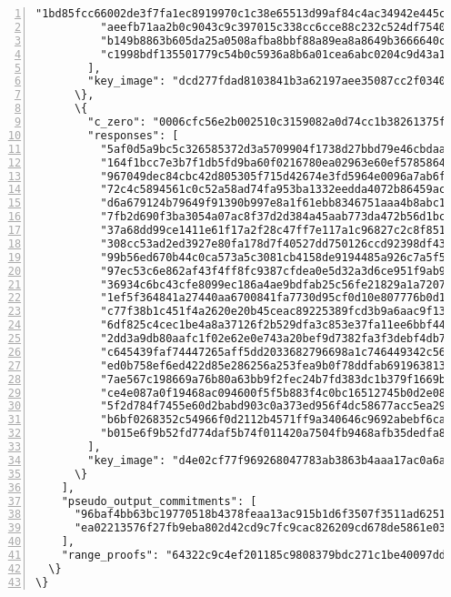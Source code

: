 \begin{appendices}
\begin{Verbatim}[commandchars=\\\{\}, numbers=left]
          "1bd85fcc66002de3f7fa1ec8919970c1c38e65513d99af84c4ac34942e445c0c",
          "aeefb71aa2b0c9043c9c397015c338cc6cce88c232c524df7540bb5de7888802",
          "b149b8863b605da25a0508afba8bbf88a89ea8a8649b3666640c9a356b4e4004",
          "c1998bdf135501779c54b0c5936a8b6a01cea6abc0204c9d43a1703f4a0ed60e"
        ],
        "key_image": "dcd277fdad8103841b3a62197aee35087cc2f03409215b93130dcc30c6386e3d"
      \},
      \{
        "c_zero": "0006cfc56e2b002510c3159082a0d74cc1b38261375f497affbe22569eae120c",
        "responses": [
          "5af0d5a9bc5c326585372d3a5709904f1738d27bbd79e46cbdaa52b882f6a00e",
          "164f1bcc7e3b7f1db5fd9ba60f0216780ea02963e60ef57858642374a4423e0e",
          "967049dec84cbc42d805305f715d42674e3fd5964e0096a7ab6fe0fda2bc5e01",
          "72c4c5894561c0c52a58ad74fa953ba1332eedda4072b86459ac6e2400979b07",
          "d6a679124b79649f91390b997e8a1f61ebb8346751aaa4b8abc1495957694b07",
          "7fb2d690f3ba3054a07ac8f37d2d384a45aab773da472b56d1bca9e3606e4608",
          "37a68dd99ce1411e61f17a2f28c47ff7e117a1c96827c2c8f851f470d2a5d305",
          "308cc53ad2ed3927e80fa178d7f40527dd750126ccd92398df43bab4a5f09f01",
          "99b56ed670b44c0ca573a5c3081cb4158de9194485a926c7a5f5d3247d38b90c",
          "97ec53c6e862af43f4ff8fc9387cfdea0e5d32a3d6ce951f9ab9bf9c09dbe700",
          "36934c6bc43cfe8099ec186a4ae9bdfab25c56fe21829a1a72071647f54f1801",
          "1ef5f364841a27440aa6700841fa7730d95cf0d10e807776b0d13a0fa4e01d0e",
          "c77f38b1c451f4a2620e20b45ceac89225389fcd3b9a6aac9f1305ded09f0401",
          "6df825c4cec1be4a8a37126f2b529dfa3c853e37fa11ee6bbf44b4965f491e00",
          "2dd3a9db80aafc1f02e62e0e743a20bef9d7382fa3f3debf4db7d6cdaffff902",
          "c645439faf74447265aff5dd2033682796698a1c746449342c56e13adee3760f",
          "ed0b758ef6ed422d85e286256a253fea9b0f78ddfab6919638136858201ff708",
          "7ae567c198669a76b80a63bb9f2fec24b7fd383dc1b379f1669b625930a30209",
          "ce4e087a0f19468ac094600f5f5b883f4c0bc16512745b0d2e082c6d9174d609",
          "5f2d784f7455e60d2babd903c0a373ed956f4dc58677acc5ea29f1f4bbdf9b0b",
          "b6bf0268352c54966f0d2112b4571ff9a340646c9692abebf6ca12f10a7c660a",
          "b015e6f9b52fd774daf5b74f011420a7504fb9468afb35dedfa8a9d493ce9e04"
        ],
        "key_image": "d4e02cf77f969268047783ab3863b4aaa17ac0a6ab1ebeab86433a932ad1663a"
      \}
    ],
    "pseudo_output_commitments": [
      "96baf4bb63bc19770518b4378feaa13ac915b1d6f3507f3511ad62510067451d",
      "ea02213576f27fb9eba802d42cd9c7fc9cac826209cd678de5861e03422d0a70"
    ],
    "range_proofs": "64322c9c4ef201185c9808379bdc271c1be40097dd5[...]627135a449a"
  \}
\}
\end{Verbatim}




\end{appendices}
